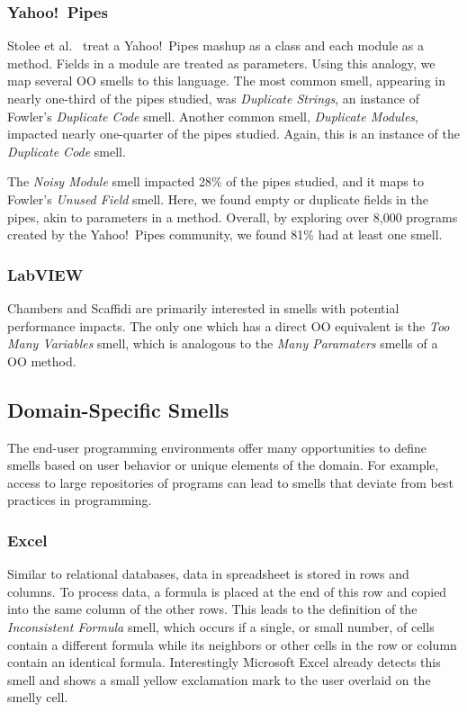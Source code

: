 \documentclass[10pt,conference,compsocconf]{IEEEtran}
\begin{document}
\subsubsection{Yahoo!\ Pipes}
Stolee et al.~\cite{Stolee2011, StoleeTSE2013} treat a Yahoo!\ Pipes mashup as a class and each module as a method.  Fields in a module are treated as parameters. Using this analogy, we map several OO smells to this language. The most common smell, appearing in nearly one-third of the pipes studied, was \emph{Duplicate Strings}, an instance of Fowler's \emph{Duplicate Code} smell. 
Another common smell, \emph{Duplicate Modules}, impacted nearly one-quarter of the pipes studied. Again, this is an instance of the \emph{Duplicate Code} smell. 

The \emph{Noisy Module} smell impacted 28\% of the pipes studied, and it maps to Fowler's \emph{Unused Field} smell. Here, we found empty or duplicate fields in the pipes, akin to parameters in a method. Overall, by exploring over 8,000 programs created by the Yahoo!\ Pipes community, we found 81\% had at least one smell. 

\subsubsection{LabVIEW}

Chambers and Scaffidi \cite{chambers2013smell} are primarily interested in smells with potential performance impacts. The only one which has a direct OO equivalent is the \emph{Too Many Variables} smell, which is analogous to the \emph{Many Paramaters} smells of a OO method.

\subsection{Domain-Specific Smells}
The end-user programming environments offer many opportunities to define smells based on user behavior or unique elements of the domain. For example, access to large repositories of programs can lead to smells that deviate from best practices in programming.

\subsubsection{Excel}

Similar to relational databases, data in spreadsheet is stored in rows and columns.
To process data, a formula is placed at the end of this row and copied into the same column of the other rows.
This leads to the definition of the \emph{Inconsistent Formula} smell, which occurs if a single, or small number, of cells contain a different formula while its neighbors or other cells in the row or column contain an identical formula.
Interestingly Microsoft Excel already detects this smell and shows a small yellow exclamation mark to the user overlaid on the smelly cell.
\end{document}
